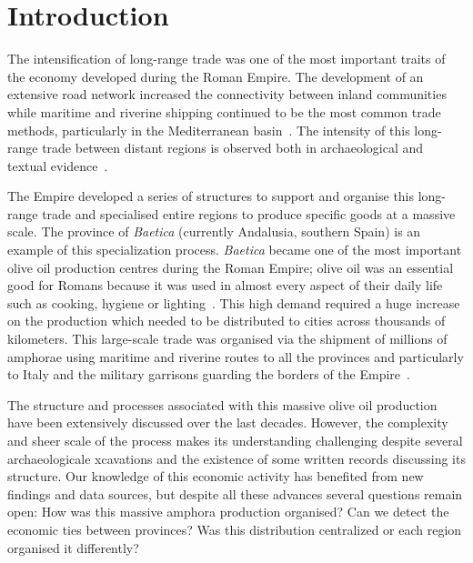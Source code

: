 \section{Introduction}
\label{intro}

The intensification of long-range trade was one of the most important traits of the economy developed during the Roman Empire. The development of an extensive road network increased the connectivity between inland communities while maritime and riverine shipping continued to be the most common trade methods, particularly in the Mediterranean basin~\citep{temin_market_2001,bevan_mediterranean_2014}. The intensity of this long-range trade between distant regions is observed both in archaeological and textual evidence~\citep{rodriguez_baetican_1998}.

The Empire developed a series of structures to support and organise this long-range trade and specialised entire regions to produce specific goods at a massive scale. The province of \textit{Baetica} (currently Andalusia, southern Spain) is an example of this specialization process. \textit{Baetica} became one of the most important olive oil production centres during the Roman Empire; olive oil was an essential good for Romans because it was used in almost every aspect of their daily life such as cooking, hygiene or lighting~\citep{mattingly_d.j._oil_1988}. This high demand required a huge increase on the production which needed to be distributed to cities across thousands of kilometers. This large-scale trade was organised via the shipment of millions of amphorae using maritime and riverine routes to all the provinces and particularly to Italy and the military garrisons guarding the borders of the Empire~\citep{blazquez_exportacion_1980}. 

The structure and processes associated with this massive olive oil production have been extensively discussed over the last decades\citep{rodriguez_economioleicola_1977, duncan1982economy, Chic_hispania_1997,millet_anforas_1998}. However, the complexity and sheer scale of the process makes its understanding challenging despite several archaeologicale xcavations and the existence of some written records discussing its structure. Our knowledge of this economic activity has benefited from new findings and data sources, but despite all these advances several questions remain open: How was this massive amphora production organised? Can we detect the economic ties between provinces? Was this distribution centralized or each region organised it differently?

